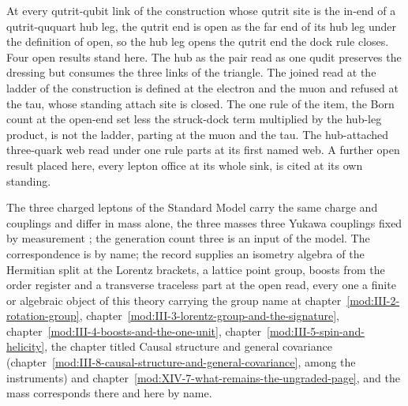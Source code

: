 At every qutrit-qubit link of the construction whose qutrit site is the in-end of a qutrit-ququart hub leg, the qutrit end is open as the far end of its hub leg under the definition of open, so the hub leg opens the qutrit end the dock rule closes.
Four open results stand here. The hub as the pair read as one qudit preserves the dressing but consumes the three links of the triangle. The joined read at the ladder of the construction is defined at the electron and the muon and refused at the tau, whose standing attach site is closed. The one rule of the item, the Born count at the open-end set less the struck-dock term multiplied by the hub-leg product, is not the ladder, parting at the muon and the tau. The hub-attached three-quark web read under one rule parts at its first named web. A further open result placed here, every lepton office at its whole sink, is cited at its own standing.
\begin{chbridge}
The three charged leptons of the Standard Model carry the same charge and couplings and differ in mass alone, the three masses three Yukawa couplings fixed by measurement \cite{Weinberg1967}; the generation count three is an input of the model. The correspondence is by name; the record supplies an isometry algebra of the Hermitian split at the Lorentz brackets, a lattice point group, boosts from the order register and a transverse traceless part at the open read, every one a finite or algebraic object of this theory carrying the group name at chapter~\ref{mod:III-2-rotation-group}, chapter~\ref{mod:III-3-lorentz-group-and-the-signature}, chapter~\ref{mod:III-4-boosts-and-the-one-unit}, chapter~\ref{mod:III-5-spin-and-helicity}, the chapter titled Causal structure and general covariance (chapter~\ref{mod:III-8-causal-structure-and-general-covariance}, among the instruments) and chapter~\ref{mod:XIV-7-what-remains-the-ungraded-page}, and the mass corresponds there and here by name.
\end{chbridge}

